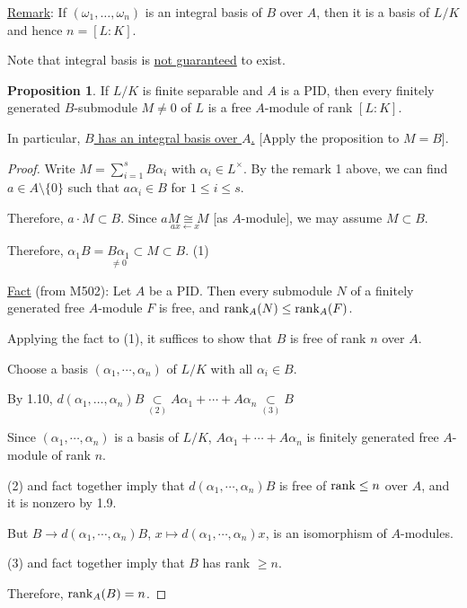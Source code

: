 \documentclass[openany]{amsbook}
\numberwithin{section}{chapter}
\theoremstyle{definition}
\newtheorem{proposition}[theorem]{Proposition}
\begin{document}
\underline{Remark}: If \((\omega_1, \dots , \omega_n)\) is an integral basis of \(B\) over \(A\), then it is a basis of \(L / K\) and hence \(n = [L : K]\).

Note that integral basis is \underline{not guaranteed} to exist.

\begin{proposition}
    If \(L / K\) is finite separable and \(A\) is a PID, then every finitely generated \(B\)-submodule \(M \neq 0\) of \(L\) is a free \(A\)-module of rank \([L : K]\).

    In particular, \underline{\(B\) has an integral basis over \(A\).} [Apply the proposition to \(M = B\)].
\end{proposition}

\begin{proof}
    Write \(M = \sum_{i=1}^{s} B \alpha_i\) with \(\alpha_i \in L^\times\). By the remark 1 above, we can find \(a \in A \setminus \{ 0 \} \) such that \(a \alpha_i \in B\) for \(1 \leq i \leq s\).

    Therefore, \(a \cdot M \subset B\). Since \(\underset{ax \leftarrow x}{aM \cong M} \) [as \(A\)-module], we may assume \(M \subset B\). 
    
    Therefore, \(\alpha_1 B = \underset{\neq 0}{B \alpha_1} \subset M \subset B\). (1)

    \underline{Fact} (from M502): Let \(A\) be a PID. Then every submodule \(N\) of a finitely generated free \(A\)-module \(F\) is free, and \(\rank_A(N) \leq \rank_A(F)\).

    Applying the fact to (1), it suffices to show that \(B\) is free of rank \(n\) over \(A\).

    Choose a basis \((\alpha_1, \cdots, \alpha_n)\) of \(L / K\) with all \(\alpha_i \in B\).
    
    By 1.10, \(d(\alpha_1, \dots , \alpha_n) B \underset{(2)}{\subset} A \alpha_1 + \cdots + A \alpha_n \underset{(3)}{\subset} B\) 

    Since \((\alpha_1, \cdots, \alpha_n)\) is a basis of \(L / K\), \(A \alpha_1 + \cdots + A \alpha_n\) is finitely generated free \(A\)-module of rank \(n\).
    
    (2) and fact together imply that \(d(\alpha_1, \cdots, \alpha_n) B\) is free of \(\rank \leq n\) over \(A\), and it is nonzero by 1.9.

    But \(B \to d(\alpha_1, \cdots, \alpha_n)B\), \(x \mapsto d(\alpha_1, \cdots, \alpha_n)x\), is an isomorphism of \(A\)-modules.
    
    (3) and fact together imply that \(B\) has rank \(\geq n\). 

    Therefore, \(\rank_A(B) = n\).

\end{proof}
\end{document}
